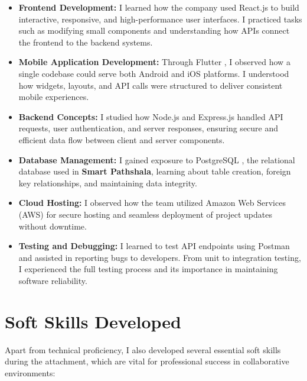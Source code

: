 \documentclass[12pt,a4paper]{report}
\newcommand{\project}[1]{\textcolor{projectcolor}{\textbf{#1}}}
\let\oldcite\cite
\renewcommand{\cite}[1]{\textcolor{impactcolor}{\oldcite{#1}}}
\newenvironment{coloritemize}
{\begin{itemize}[label=\textcolor{primaryblue}{$\bullet$}]}
{\end{itemize}}
\begin{document}
\begin{coloritemize}
    \item \textcolor{secondaryblue}{\textbf{Frontend Development:}} I learned how the company used React.js to build interactive, responsive, and high-performance user interfaces. I practiced tasks such as modifying small components and understanding how APIs connect the frontend to the backend systems.
    
    \item \textcolor{secondaryblue}{\textbf{Mobile Application Development:}} Through Flutter \cite{ref4}, I observed how a single codebase could serve both Android and iOS platforms. I understood how widgets, layouts, and API calls were structured to deliver consistent mobile experiences.
    
    \item \textcolor{secondaryblue}{\textbf{Backend Concepts:}} I studied how Node.js and Express.js handled API requests, user authentication, and server responses, ensuring secure and efficient data flow between client and server components.
    
    \item \textcolor{secondaryblue}{\textbf{Database Management:}} I gained exposure to PostgreSQL \cite{ref6}, the relational database used in \project{Smart Pathshala}, learning about table creation, foreign key relationships, and maintaining data integrity.
    
    \item \textcolor{secondaryblue}{\textbf{Cloud Hosting:}} I observed how the team utilized Amazon Web Services (AWS) \cite{ref7} for secure hosting and seamless deployment of project updates without downtime.
    
    \item \textcolor{secondaryblue}{\textbf{Testing and Debugging:}} I learned to test API endpoints using Postman and assisted in reporting bugs to developers. From unit to integration testing, I experienced the full testing process and its importance in maintaining software reliability.
\end{coloritemize}

\section{Soft Skills Developed}
Apart from technical proficiency, I also developed several essential soft skills during the attachment, which are vital for professional success in collaborative environments:
\end{document}
